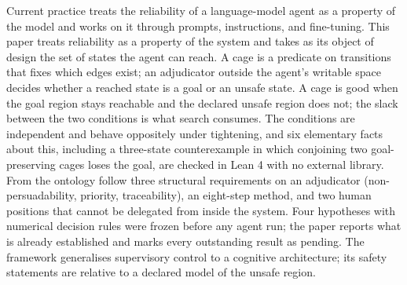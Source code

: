 Current practice treats the reliability of a language-model agent as a property of the model and works on it through prompts, instructions, and fine-tuning. This paper treats reliability as a property of the system and takes as its object of design the set of states the agent can reach. A cage is a predicate on transitions that fixes which edges exist; an adjudicator outside the agent's writable space decides whether a reached state is a goal or an unsafe state. A cage is good when the goal region stays reachable and the declared unsafe region does not; the slack between the two conditions is what search consumes. The conditions are independent and behave oppositely under tightening, and six elementary facts about this, including a three-state counterexample in which conjoining two goal-preserving cages loses the goal, are checked in Lean 4 with no external library. From the ontology follow three structural requirements on an adjudicator (non-persuadability, priority, traceability), an eight-step method, and two human positions that cannot be delegated from inside the system. Four hypotheses with numerical decision rules were frozen before any agent run; the paper reports what is already established and marks every outstanding result as pending. The framework generalises supervisory control to a cognitive architecture; its safety statements are relative to a declared model of the unsafe region.
